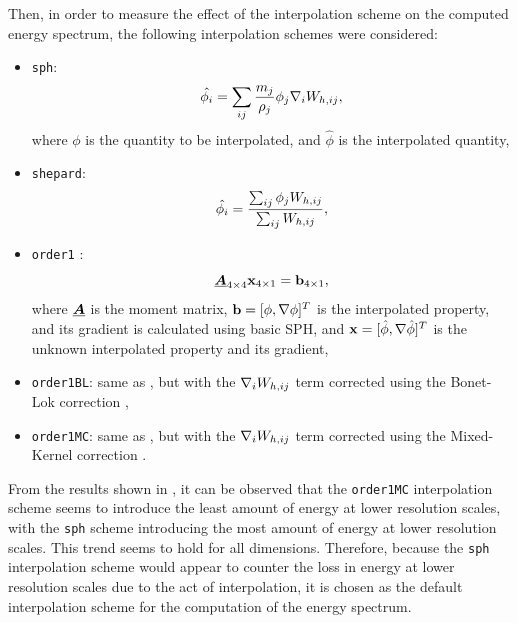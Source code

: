 Then, in order to measure the effect of the interpolation scheme on the computed energy spectrum, the following interpolation schemes were considered:
\begin{itemize}
    \item \texttt{sph}:
    \begin{equation}
        \hat{\phi_i} = \sum_{ij} \frac{m_j}{\rho_j} \phi_j \nabla_{i} W_{h, ij},
    \end{equation}
	where $\phi$ is the quantity to be interpolated, and $\hat{\phi}$ is the interpolated quantity,
    
    \item \texttt{shepard}:
    \begin{equation}
        \hat{\phi_i} = \frac{\sum_{ij} \phi_j W_{h, ij}}{\sum_{ij} W_{h, ij}},
    \end{equation}

    \item \texttt{order1} \parencite{Liu2006}:
    \begin{equation}
      \underline{\bm{A}}_{4 \times 4} \mathbf{x}_{4 \times 1} = \mathbf{b}_{4 \times 1},
      \label{eq:interp-order1}
    \end{equation}
    where $\underline{\bm{A}}$ is the moment matrix, $\mathbf{b} = [\phi, \nabla \phi]^T$ is the interpolated property, and its gradient is calculated using basic SPH, and $\mathbf{x} = [\hat{\phi}, \nabla \hat{\phi}]^T$ is the unknown interpolated property and its gradient,

    \item \texttt{order1BL}: same as , but with the $\nabla_{i} W_{h, ij}$ term corrected using the Bonet-Lok correction \parencite{bonet1999variational},

    \item \texttt{order1MC}: same as , but with the $\nabla_{i} W_{h, ij}$ term corrected using the Mixed-Kernel correction \parencite{bonet1999variational}.
\end{itemize}

From the results shown in , it can be observed that the \texttt{order1MC} interpolation scheme seems to introduce the least amount of energy at lower resolution scales, with the \texttt{sph} scheme introducing the most amount of energy at lower resolution scales. This trend seems to hold for all dimensions.
Therefore, because the \texttt{sph} interpolation scheme would appear to counter the loss in energy at lower resolution scales due to the act of interpolation, it is chosen as the default interpolation scheme for the computation of the energy spectrum.

